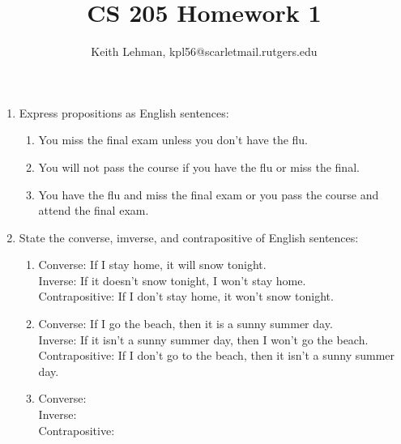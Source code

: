 \documentclass{article}
\title{CS 205 Homework 1}
\author{Keith Lehman, kpl56@scarletmail.rutgers.edu}
\begin{document}
\maketitle

\begin{enumerate}
    \item Express propositions as English sentences:
    \begin{enumerate}
        \item You miss the final exam unless you don't have the flu.
        \item You will not pass the course if you have the flu or miss the final.
        \item You have the flu and miss the final exam or you pass the course and attend the final exam.
    \end{enumerate}
    \item State the converse, imverse, and contrapositive of English sentences:
    \begin{enumerate}
        \item
        Converse: If I stay home, it will snow tonight. \\
        Inverse: If it doesn't snow tonight, I won't stay home. \\
        Contrapositive: If I don't stay home, it won't snow tonight. \\
        \item
        Converse: If I go the beach, then it is a sunny summer day. \\
        Inverse: If it isn't a sunny summer day, then I won't go the beach. \\
        Contrapositive: If I don't go to the beach, then it isn't a sunny summer day. \\
        \item
        Converse: \\
        Inverse: \\
        Contrapositive: \\
    \end{enumerate}
\end{enumerate}
\end{document}
